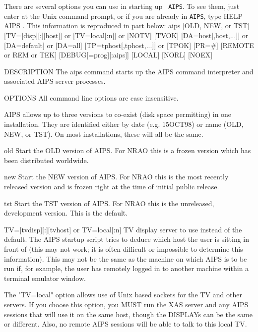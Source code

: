      There are several options you can use in starting up {\tt
AIPS}\@.  To see them, just enter {\tt {}} at the Unix
command prompt, or if you are already in {\tt AIPS}, type {\us HELP
AIPS \CR}\@.  This information is reproduced in part below:
\bve
       aips [OLD, NEW, or TST]
            [TV=[disp][:][host]]
         or [TV=local[:n]]
         or [NOTV]
            [TVOK]
            [DA=host[,host,...]]
         or [DA=default]
         or [DA=all]
            [TP=tphost[,tphost,...]]
         or [TPOK]
            [PR=#]
            [REMOTE or REM or TEK]
            [DEBUG[=prog][:aips]]
            [LOCAL] [NORL] [NOEX]

DESCRIPTION
       The  aips  command  starts up the AIPS command interpreter and associated AIPS
       server processes.

OPTIONS
       All command line options are case insensitive.

       AIPS allows up to three versions to co-exist (disk space  permitting)  in  one
       installation.  They are identified either by date (e.g. 15OCT98) or name (OLD,
       NEW, or TST).  On most installations, these will all be the same.

       old     Start the OLD version of AIPS.  For NRAO  this  is  a  frozen  version
               which has been distributed worldwide.

       new     Start  the  NEW  version  of AIPS.  For NRAO this is the most recently
               released version and is frozen right at the  time  of  initial  public
               release.

       tst     Start  the  TST  version  of  AIPS.   For NRAO this is the unreleased,
               development version.  This is the default.

       TV=[tvdisp][:][tvhost] or TV=local[:n]
               TV display server to use instead of the  default.   The  AIPS  startup
               script  tries  to  deduce  which  host the user is sitting in front of
               (this may not work; it is often difficult or impossible  to  determine
               this  information).   This may not be the same as the machine on which
               AIPS is to be run if, for example, the user has remotely logged in  to
               another machine within a terminal emulator window.

               The  "TV=local" option allows use of Unix based sockets for the TV and
               other servers.  If you choose this option, you MUST run the XAS server
               and  any  AIPS  sessions that will use it on the same host, though the
               DISPLAYs can be the same or different.  Also, no remote AIPS  sessions
               will be able to talk to this local TV.

